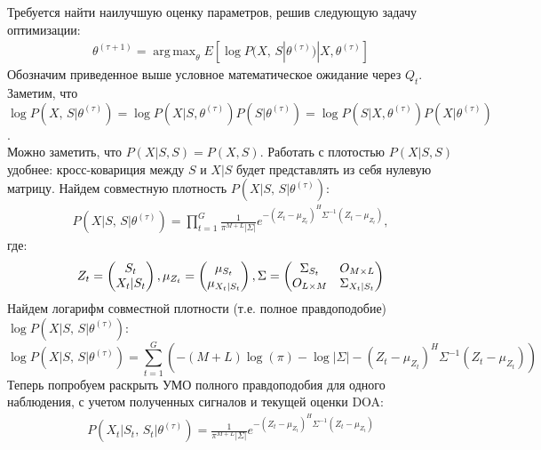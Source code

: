\documentclass[11pt]{article}
\DeclareMathOperator*{\argmax}{arg\,max}
\begin{document}
\begin{center}
\fontsize{16}{20}\selectfont {}
\end{center}
Требуется найти наилучшую оценку параметров, решив следующую задачу оптимизации:
\begin{gather}
\theta^{(\tau+1)}=\argmax_{\theta} E[\log P(X, \, S|\theta^{(\tau)})|X, \theta^{(\tau)}]
\end{gather}
Обозначим приведенное выше условное математическое ожидание через $Q_t$. 
Заметим, что \\ $\log P(X, \, S|\theta^{(\tau)}) = \log P(X|S,\theta^{(\tau)})P(S|\theta^{(\tau)}) = \log P(S|X,\theta^{(\tau)})P(X|\theta^{(\tau)})$.\\
Можно заметить, что $P(X|S, S) = P(X, S)$. Работать с плотостью $P(X|S, S)$ удобнее: кросс-ковариция между $S$ и $X|S$ будет представлять из себя нулевую матрицу.
Найдем совместную плотность $P(X|S, \, S|\theta^{(\tau)})$:
\begin{gather}
P(X|S, \, S|\theta^{(\tau)}) = \prod_{t=1}^G \frac{1}{\pi^{M+L}|\Sigma|}e^{-(Z_t-\mu_{Z_t})^H\Sigma^{-1}(Z_t-\mu_{Z_t})},
\end{gather}
где:
\begin{equation*}
Z_t = \begin{pmatrix}
S_t\\
X_t|S_t
\end{pmatrix},
\mu_{Z_t} = \begin{pmatrix}
\mu_{S_t}\\
\mu_{X_t|S_t}
\end{pmatrix}\\,
\Sigma = 
\begin{pmatrix}
\Sigma_{S_t}&O_{M\times L}\\
O_{L\times M}&\Sigma_{X_t|S_t}
\end{pmatrix}
\end{equation*}
Найдем логарифм совместной плотности (т.е. полное правдоподобие) $\log P(X|S, \, S|\theta^{(\tau)})$:
\begin{equation*}
\log P(X|S, \, S|\theta^{(\tau)}) = \sum_{t=1}^G \left(-(M+L)\log(\pi)-\log|\Sigma|-(Z_t-\mu_{Z_t})^H\Sigma^{-1}(Z_t-\mu_{Z_t})\right)
\end{equation*}
Теперь попробуем раскрыть УМО полного правдоподобия для одного наблюдения, с учетом полученных сигналов и текущей оценки DOA:
\begin{gather}
P(X_t|S_t, \, S_t|\theta^{(\tau)}) = \frac{1}{\pi^{M+L}|\Sigma|}e^{-(Z_t-\mu_{Z_t})^H\Sigma^{-1}(Z_t-\mu_{Z_t})}
\end{gather}
\end{document}
